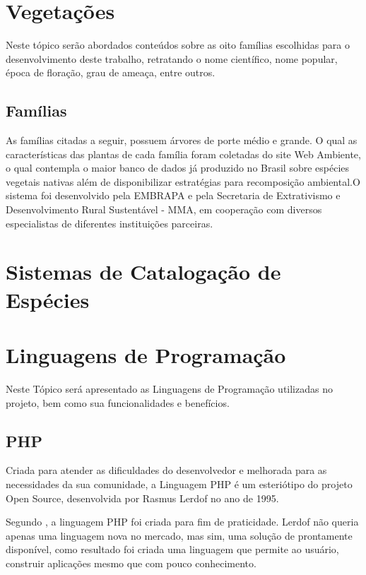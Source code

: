 \section{Vegetações}

Neste tópico serão abordados conteúdos sobre as oito famílias escolhidas para o desenvolvimento deste trabalho, retratando o nome científico, nome popular, época de floração, grau de ameaça, entre outros.

\subsection{Famílias}

As famílias citadas a seguir, possuem  árvores de porte médio e grande. O qual as características das plantas de cada família foram coletadas do site Web Ambiente, o qual contempla o maior banco de dados já produzido no Brasil sobre espécies vegetais nativas além de disponibilizar estratégias para recomposição ambiental.O sistema foi desenvolvido pela EMBRAPA e pela Secretaria de Extrativismo e Desenvolvimento Rural Sustentável - MMA, em cooperação com diversos especialistas de diferentes instituições parceiras.


\section{Sistemas de Catalogação de Espécies}

 
\section{Linguagens de Programação}	

Neste Tópico será apresentado as Linguagens de Programação utilizadas no projeto, bem como sua funcionalidades e benefícios.

\subsection{PHP}

Criada para atender as dificuldades do desenvolvedor e melhorada para as necessidades da sua comunidade, a Linguagem PHP é um esteriótipo do projeto Open Source, desenvolvida por Rasmus Lerdof no ano de 1995.

Segundo , a linguagem PHP foi criada para fim de praticidade. Lerdof não queria apenas uma linguagem nova no mercado, mas sim, uma solução de prontamente disponível, como resultado foi criada uma linguagem que permite ao usuário, construir aplicações mesmo que com pouco conhecimento.

